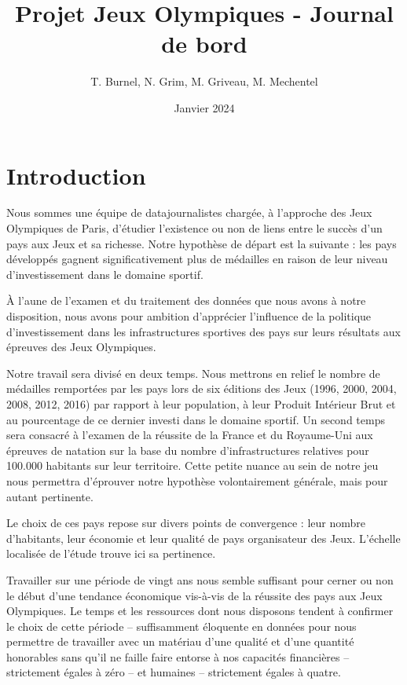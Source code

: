 \documentclass[hidelinks, 12pt]{report}
\title{Projet Jeux Olympiques - Journal de bord}
\date{Janvier 2024}
\author{T. Burnel, N. Grim, M. Griveau, M. Mechentel}
\begin{document}
\maketitle





%





\tableofcontents

\chapter{Introduction}

Nous sommes une équipe de datajournalistes chargée, à l'approche des Jeux Olympiques de Paris, d'étudier l'existence ou non de liens entre le succès d'un pays aux Jeux et sa richesse. Notre hypothèse de départ est la suivante : les pays développés gagnent significativement plus de médailles en raison de leur niveau d'investissement dans le domaine sportif.

À l'aune de l'examen et du traitement des données que nous avons à notre disposition, nous avons pour ambition d'apprécier l'influence de la politique d'investissement dans les infrastructures sportives des pays sur leurs résultats aux épreuves des Jeux Olympiques.

Notre travail sera divisé en deux temps. Nous mettrons en relief le nombre de médailles remportées par les pays lors de six éditions des Jeux (1996, 2000, 2004, 2008, 2012, 2016) par rapport à leur population, à leur Produit Intérieur Brut et au pourcentage de ce dernier investi dans le domaine sportif. Un second temps sera consacré à l'examen de la réussite de la France et du Royaume-Uni aux épreuves de natation sur la base du nombre d'infrastructures relatives pour 100.000 habitants sur leur territoire. Cette petite nuance au sein de notre jeu nous permettra d'éprouver notre hypothèse volontairement générale, mais pour autant pertinente.

Le choix de ces pays repose sur divers points de convergence : leur nombre d'habitants, leur économie et leur qualité de pays organisateur des Jeux. L'échelle localisée de l'étude trouve ici sa pertinence.

Travailler sur une période de vingt ans nous semble suffisant pour cerner ou non le début d'une tendance économique vis-à-vis de la réussite des pays aux Jeux Olympiques. Le temps et les ressources dont nous disposons tendent à confirmer le choix de cette période -- suffisamment éloquente en données pour nous permettre de travailler avec un matériau d'une qualité et d'une quantité honorables sans qu'il ne faille faire entorse à nos capacités financières -- strictement égales à zéro -- et humaines -- strictement égales à quatre.
\end{document}
